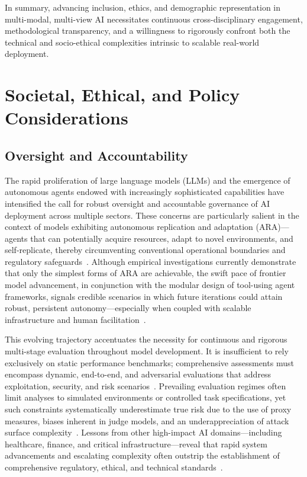 \documentclass[sigconf]{acmart}
\begin{document}
In summary, advancing inclusion, ethics, and demographic representation in multi-modal, multi-view AI necessitates continuous cross-disciplinary engagement, methodological transparency, and a willingness to rigorously confront both the technical and socio-ethical complexities intrinsic to scalable real-world deployment.

\section{Societal, Ethical, and Policy Considerations}

\subsection{Oversight and Accountability}

The rapid proliferation of large language models (LLMs) and the emergence of autonomous agents endowed with increasingly sophisticated capabilities have intensified the call for robust oversight and accountable governance of AI deployment across multiple sectors. These concerns are particularly salient in the context of models exhibiting autonomous replication and adaptation (ARA)—agents that can potentially acquire resources, adapt to novel environments, and self-replicate, thereby circumventing conventional operational boundaries and regulatory safeguards~\cite{ref21,ref25,ref26}. Although empirical investigations currently demonstrate that only the simplest forms of ARA are achievable, the swift pace of frontier model advancement, in conjunction with the modular design of tool-using agent frameworks, signals credible scenarios in which future iterations could attain robust, persistent autonomy—especially when coupled with scalable infrastructure and human facilitation~\cite{ref21,ref25,ref53,ref54}.

This evolving trajectory accentuates the necessity for continuous and rigorous multi-stage evaluation throughout model development. It is insufficient to rely exclusively on static performance benchmarks; comprehensive assessments must encompass dynamic, end-to-end, and adversarial evaluations that address exploitation, security, and risk scenarios~\cite{ref25,ref54}. Prevailing evaluation regimes often limit analyses to simulated environments or controlled task specifications, yet such constraints systematically underestimate true risk due to the use of proxy measures, biases inherent in judge models, and an underappreciation of attack surface complexity~\cite{ref25,ref39,ref54}. Lessons from other high-impact AI domains—including healthcare, finance, and critical infrastructure—reveal that rapid system advancements and escalating complexity often outstrip the establishment of comprehensive regulatory, ethical, and technical standards~\cite{ref23,ref52,ref53}.
\end{document}

